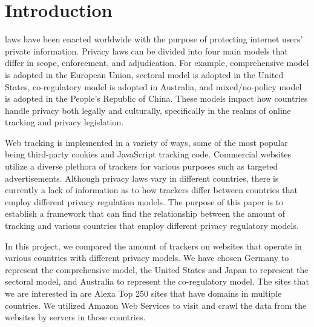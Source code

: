 \documentclass[conference]{IEEEtran}
\begin{document}
\section{Introduction}
% 
% 
% 
% 
laws have been enacted worldwide with the purpose of protecting internet users' private information. Privacy laws can be divided into four main models
 \cite{IAPPbook} that differ in scope, enforcement, and adjudication. For example, comprehensive model is adopted in the European Union, sectoral model is adopted in the United States,  co-regulatory model is adopted in Australia, and mixed/no-policy model is adopted in the People's Republic of China. These models impact how countries handle privacy both legally and culturally, specifically in the realms of online tracking and privacy legislation. 

Web tracking is implemented in a variety of ways, some of the most popular being third-party cookies and JavaScript tracking code. Commercial websites utilize a diverse plethora of trackers for various purposes such as targeted advertisements. Although privacy laws vary in different countries, there is currently a lack of information as to how trackers differ between countries that employ different privacy regulation models. The purpose of this paper is to establish a framework that can find the relationship between the amount of tracking and various countries that employ different privacy regulatory models.

In this project, we compared the amount of trackers on websites that operate in various countries with different privacy models. We have chosen Germany to represent the comprehensive model, the United States and Japan to represent the sectoral model, and Australia to represent the co-regulatory model. The sites that we are interested in are Alexa Top 250 sites \cite{Alexa} that have domains in multiple countries. We utilized Amazon Web Services to visit and crawl the data from the websites by servers in those countries.
\end{document}
